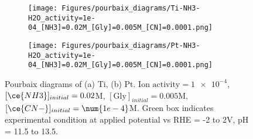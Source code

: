 

\begin{figure}[htbp]
    \centering
    \begin{subfigure}[b]{0.45\textwidth}
        \subcaption{}\label{fig:Ti_Pourbaix_NH3_Gly_CN}
        \texttt{[image: Figures/pourbaix\_diagrams/Ti-NH3-H2O\_activity=1e-04\_[NH3]=0.02M\_[Gly]=0.005M\_[CN]=0.0001.png]}
        \par\medskip
    \end{subfigure}
    \begin{subfigure}[b]{0.45\textwidth}
        \subcaption{}\label{fig:Pt_Pourbaix_NH3_Gly_CN}
        \texttt{[image: Figures/pourbaix\_diagrams/Pt-NH3-H2O\_activity=1e-04\_[NH3]=0.02M\_[Gly]=0.005M\_[CN]=0.0001.png]}
        \par\medskip   
    \end{subfigure}
    \caption{Pourbaix diagrams of (a) Ti, (b) Pt. $\text{Ion activity}=\num{1e-4}$, $[\ce{NH3}]_{initial}= 0.02$M, $[\text{Gly}]_{initial}=0.005$M,  $[\ce{CN-}]_{initial}=\num{1e-4}$M. Green box indicates experimental condition at applied potential vs RHE = -2 to 2V, pH = 11.5 to 13.5.}
    \label{fig:Ti_Pt_Pourbaix}
\end{figure}

